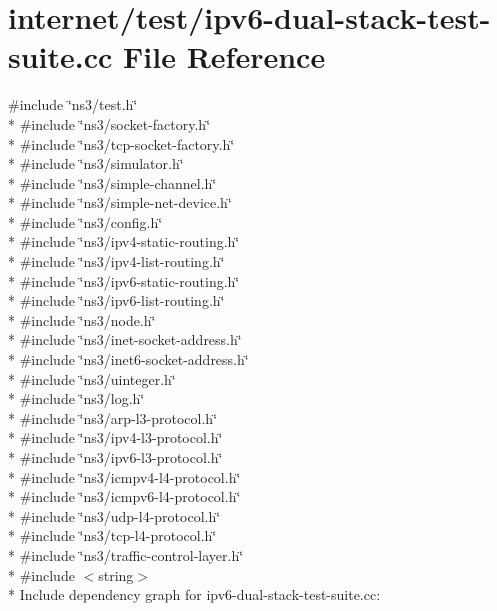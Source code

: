 \hypertarget{ipv6-dual-stack-test-suite_8cc}{}\section{internet/test/ipv6-\/dual-\/stack-\/test-\/suite.cc File Reference}
\label{ipv6-dual-stack-test-suite_8cc}
{\ttfamily \#include \char`\"{}ns3/test.\+h\char`\"{}}\\*
{\ttfamily \#include \char`\"{}ns3/socket-\/factory.\+h\char`\"{}}\\*
{\ttfamily \#include \char`\"{}ns3/tcp-\/socket-\/factory.\+h\char`\"{}}\\*
{\ttfamily \#include \char`\"{}ns3/simulator.\+h\char`\"{}}\\*
{\ttfamily \#include \char`\"{}ns3/simple-\/channel.\+h\char`\"{}}\\*
{\ttfamily \#include \char`\"{}ns3/simple-\/net-\/device.\+h\char`\"{}}\\*
{\ttfamily \#include \char`\"{}ns3/config.\+h\char`\"{}}\\*
{\ttfamily \#include \char`\"{}ns3/ipv4-\/static-\/routing.\+h\char`\"{}}\\*
{\ttfamily \#include \char`\"{}ns3/ipv4-\/list-\/routing.\+h\char`\"{}}\\*
{\ttfamily \#include \char`\"{}ns3/ipv6-\/static-\/routing.\+h\char`\"{}}\\*
{\ttfamily \#include \char`\"{}ns3/ipv6-\/list-\/routing.\+h\char`\"{}}\\*
{\ttfamily \#include \char`\"{}ns3/node.\+h\char`\"{}}\\*
{\ttfamily \#include \char`\"{}ns3/inet-\/socket-\/address.\+h\char`\"{}}\\*
{\ttfamily \#include \char`\"{}ns3/inet6-\/socket-\/address.\+h\char`\"{}}\\*
{\ttfamily \#include \char`\"{}ns3/uinteger.\+h\char`\"{}}\\*
{\ttfamily \#include \char`\"{}ns3/log.\+h\char`\"{}}\\*
{\ttfamily \#include \char`\"{}ns3/arp-\/l3-\/protocol.\+h\char`\"{}}\\*
{\ttfamily \#include \char`\"{}ns3/ipv4-\/l3-\/protocol.\+h\char`\"{}}\\*
{\ttfamily \#include \char`\"{}ns3/ipv6-\/l3-\/protocol.\+h\char`\"{}}\\*
{\ttfamily \#include \char`\"{}ns3/icmpv4-\/l4-\/protocol.\+h\char`\"{}}\\*
{\ttfamily \#include \char`\"{}ns3/icmpv6-\/l4-\/protocol.\+h\char`\"{}}\\*
{\ttfamily \#include \char`\"{}ns3/udp-\/l4-\/protocol.\+h\char`\"{}}\\*
{\ttfamily \#include \char`\"{}ns3/tcp-\/l4-\/protocol.\+h\char`\"{}}\\*
{\ttfamily \#include \char`\"{}ns3/traffic-\/control-\/layer.\+h\char`\"{}}\\*
{\ttfamily \#include $<$string$>$}\\*
Include dependency graph for ipv6-\/dual-\/stack-\/test-\/suite.cc\+:
